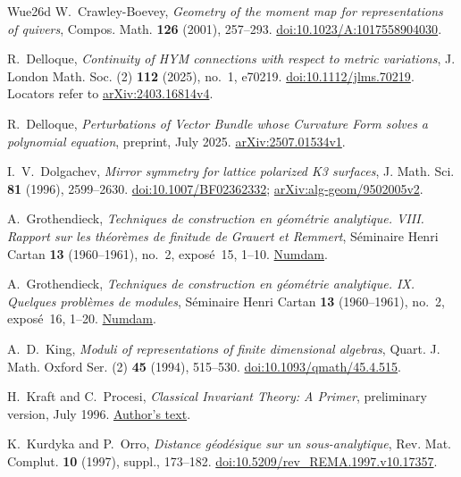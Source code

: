 \begin{thebibliography}{Wue26d}
W.~Crawley-Boevey, \textit{Geometry of the moment map for representations
of quivers}, Compos. Math. \textbf{126} (2001), 257--293.
\href{https://doi.org/10.1023/A:1017558904030}{doi:10.1023/A:1017558904030}.

R.~Delloque,
\textit{Continuity of HYM connections with respect to metric variations},
J. London Math. Soc. (2) \textbf{112} (2025), no.~1, e70219.
\href{https://doi.org/10.1112/jlms.70219}{doi:10.1112/jlms.70219}.
Locators refer to \href{https://arxiv.org/abs/2403.16814v4}{arXiv:2403.16814v4}.

R.~Delloque, \textit{Perturbations of Vector Bundle whose Curvature Form
solves a polynomial equation}, preprint, July 2025.
\href{https://arxiv.org/abs/2507.01534v1}{arXiv:2507.01534v1}.

I.~V.~Dolgachev, \textit{Mirror symmetry for lattice polarized K3 surfaces},
J. Math. Sci. \textbf{81} (1996), 2599--2630.
\href{https://doi.org/10.1007/BF02362332}{doi:10.1007/BF02362332};
\href{https://arxiv.org/abs/alg-geom/9502005v2}{arXiv:alg-geom/9502005v2}.

A.~Grothendieck, \textit{Techniques de construction en g\'eom\'etrie
analytique. VIII. Rapport sur les th\'eor\`emes de finitude de Grauert
et Remmert}, S\'eminaire Henri Cartan \textbf{13} (1960--1961), no.~2,
expos\'e~15, 1--10.
\href{https://numdam.org/item/SHC_1960-1961__13_2_A2_0/}{Numdam}.

A.~Grothendieck, \textit{Techniques de construction en g\'eom\'etrie
analytique. IX. Quelques probl\`emes de modules},
S\'eminaire Henri Cartan \textbf{13} (1960--1961), no.~2,
expos\'e~16, 1--20.
\href{https://numdam.org/item/SHC_1960-1961__13_2_A3_0/}{Numdam}.

A.~D.~King, \textit{Moduli of representations of finite dimensional
algebras}, Quart. J. Math. Oxford Ser. (2) \textbf{45} (1994), 515--530.
\href{https://doi.org/10.1093/qmath/45.4.515}{doi:10.1093/qmath/45.4.515}.

H.~Kraft and C.~Procesi, \textit{Classical Invariant Theory: A Primer},
preliminary version, July 1996.
\href{https://dmi.unibas.ch/fileadmin/user_upload/dmi/Personen/Kraft_Hanspeter/Classical_Invariant_Theory.pdf}{Author's text}.

K.~Kurdyka and P.~Orro, \textit{Distance g\'eod\'esique sur un sous-analytique},
Rev. Mat. Complut. \textbf{10} (1997), suppl., 173--182.
\href{https://doi.org/10.5209/rev_REMA.1997.v10.17357}{doi:10.5209/rev\_REMA.1997.v10.17357}.


\end{thebibliography}
